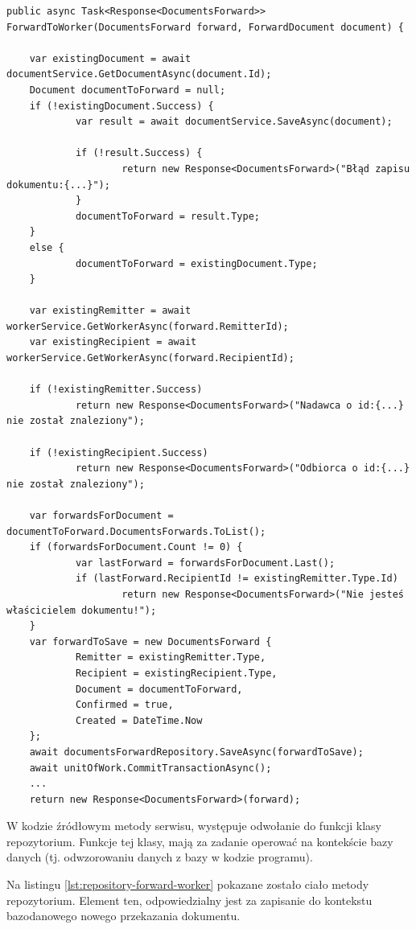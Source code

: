\begin{lstlisting}[label=lst:service-forward-worker,caption=Kod metody serwisu przekazywania dokumentów pracownikowi, captionpos=b,basicstyle=\footnotesize\ttfamily,style=sharpcstyle,language={[Sharp]C}]
public async Task<Response<DocumentsForward>> ForwardToWorker(DocumentsForward forward, ForwardDocument document) {		
			
	var existingDocument = await documentService.GetDocumentAsync(document.Id);
	Document documentToForward = null;
	if (!existingDocument.Success) {
			var result = await documentService.SaveAsync(document);
								
			if (!result.Success) {
					return new Response<DocumentsForward>("Błąd zapisu dokumentu:{...}");
			}
			documentToForward = result.Type;
	}
	else {
			documentToForward = existingDocument.Type;
	}

	var existingRemitter = await workerService.GetWorkerAsync(forward.RemitterId);
	var existingRecipient = await workerService.GetWorkerAsync(forward.RecipientId);

	if (!existingRemitter.Success)
			return new Response<DocumentsForward>("Nadawca o id:{...} nie został znaleziony");

	if (!existingRecipient.Success)
			return new Response<DocumentsForward>("Odbiorca o id:{...} nie został znaleziony");
	
	var forwardsForDocument = documentToForward.DocumentsForwards.ToList();
	if (forwardsForDocument.Count != 0) {
			var lastForward = forwardsForDocument.Last();
			if (lastForward.RecipientId != existingRemitter.Type.Id)
					return new Response<DocumentsForward>("Nie jesteś właścicielem dokumentu!");	
	}
	var forwardToSave = new DocumentsForward {
			Remitter = existingRemitter.Type,
			Recipient = existingRecipient.Type,
			Document = documentToForward,
			Confirmed = true,
			Created = DateTime.Now
	};
	await documentsForwardRepository.SaveAsync(forwardToSave);
	await unitOfWork.CommitTransactionAsync();
	...
	return new Response<DocumentsForward>(forward);
\end{lstlisting}

W kodzie źródłowym metody serwisu, występuje odwołanie do funkcji klasy repozytorium. Funkcje tej klasy, mają za zadanie operować na kontekście bazy danych (tj. odwzorowaniu danych z bazy w kodzie programu).

Na listingu \ref{lst:repository-forward-worker} pokazane zostało ciało metody repozytorium. Element ten, odpowiedzialny jest za zapisanie do kontekstu bazodanowego nowego przekazania dokumentu.

